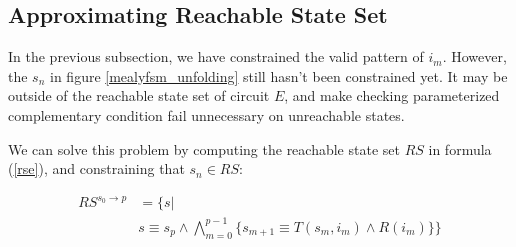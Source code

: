 \documentclass[journal]{IEEEtran}
\begin{document}
\subsection{Approximating Reachable State Set}\label{subsec_Prfx}
In the previous subsection, we have constrained the valid pattern of $i_m$.
However,
the $s_n$ in figure \ref{mealyfsm_unfolding} still hasn't been constrained yet.
It may be outside of the reachable state set of circuit $E$,
and make checking parameterized complementary condition fail unnecessary on unreachable states.

We can solve this problem by computing the reachable state set $RS$ in formula (\ref{rse}),
and constraining that $s_n\in RS$:

\begin{equation}\label{rse_p_forward}
\begin{split}
RS^{s_0\to p} & =  \Big\{s| \\
& s\equiv s_p\wedge \bigwedge_{m=0}^{p-1}\big\{
s_{m+1}\equiv T(s_m,i_m)\wedge R(i_m)
\big\}\Big\}
\end{split}
\end{equation}

\vspace{0.2cm}
\end{document}
